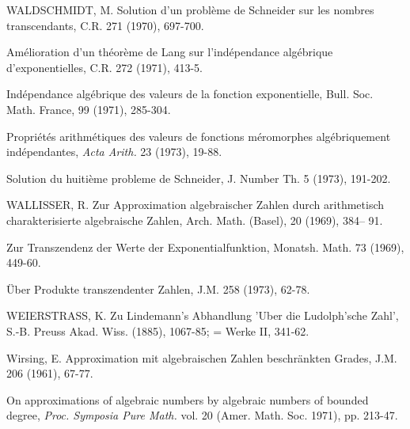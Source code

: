 \begin{hanglist}
    \item WALDSCHMIDT, M. Solution d'un problème de Schneider sur les nombres transcendants, C.R. 271 (1970), 697-700.
    \item \hspace{1.5em} Amélioration d'un théorème de Lang sur l'indépendance algébrique d'exponentielles, C.R. 272 (1971), 413-5.
    \item \hspace{1.5em} Indépendance algébrique des valeurs de la fonction exponentielle, Bull. Soc. Math. France, 99 (1971), 285-304.
    \item \hspace{1.5em} Propriétés arithmétiques des valeurs de fonctions méromorphes algébriquement indépendantes, \textit{Acta Arith.} 23 (1973), 19-88.
    \item \hspace{1.5em} Solution du huitième probleme de Schneider, J. Number Th. 5 (1973), 191-202.
    \item WALLISSER, R. Zur Approximation algebraischer Zahlen durch arithmetisch charakterisierte algebraische Zahlen, Arch. Math. (Basel), 20 (1969), 384– 91.
    \item \hspace{1.5em} Zur Transzendenz der Werte der Exponentialfunktion, Monatsh. Math. 73 (1969), 449-60.
    \item \hspace{1.5em} Über Produkte transzendenter Zahlen, J.M. 258 (1973), 62-78.
    \item WEIERSTRASS, K. Zu Lindemann's Abhandlung 'Uber die Ludolph'sche Zahl', S.-B. Preuss Akad. Wiss. (1885), 1067-85; = Werke II, 341-62.
    \item Wirsing, E. Approximation mit algebraischen Zahlen beschränkten Grades, J.M. 206 (1961), 67-77.
    \item \hspace{1.5em} On approximations of algebraic numbers by algebraic numbers of bounded degree, \textit{Proc. Symposia Pure Math.} vol. 20 (Amer. Math. Soc. 1971), pp. 213-47.
\end{hanglist}
